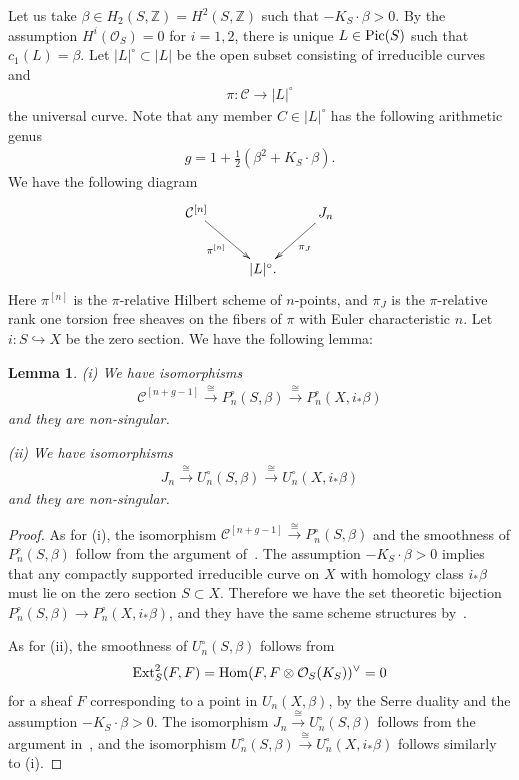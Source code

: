 \documentclass[11pt]{amsart}
\theoremstyle{plain}
\newtheorem{lem}[thm]{Lemma}
\newcommand{\cC}{\mathcal{C}}
\newcommand{\oO}{\mathcal{O}}
\newcommand{\Hom}{\mathop{\rm Hom}\nolimits}
\newcommand{\Pic}{\mathop{\rm Pic}\nolimits}
\newcommand{\Ext}{\mathop{\rm Ext}\nolimits}
\begin{document}
Let us take $\beta \in H_2(S, \mathbb{Z})=H^2(S, \mathbb{Z})$
such that $-K_S \cdot \beta>0$. 
By the assumption $H^i(\oO_S)=0$ for $i=1, 2$, there is unique 
$L \in \Pic(S)$ such that 
$c_1(L)=\beta$. 
Let
$\lvert L \rvert^{\circ} \subset \lvert L \rvert$
be the open subset consisting of 
irreducible curves and 
\begin{align*}
\pi \colon \cC \to \lvert L \rvert^{\circ}
\end{align*}
the universal curve. 
Note that any member $C \in \lvert L \vert^{\circ}$ has 
the following arithmetic genus
\begin{align*}
g=1+\frac{1}{2}(\beta^2+K_S \cdot \beta).
\end{align*}
We have the following diagram
\begin{align*}
\xymatrix{
\cC^{[n]} \ar[rd]_-{\pi^{[n]}} & & J_n \ar[ld]^-{\pi_J} \\
& \lvert L \rvert^{\circ}. 
}
\end{align*}
Here $\pi^{[n]}$ is the $\pi$-relative Hilbert scheme of $n$-points, 
and $\pi_J$ is the $\pi$-relative rank one torsion free sheaves
on the fibers of $\pi$ with Euler characteristic $n$. 
Let $i \colon S \hookrightarrow X$ be the zero section.
We have the following lemma: 
\begin{lem}\label{lem:locsurface}
(i) We have isomorphisms
\begin{align*}
\cC^{[n+g-1]} \stackrel{\cong}{\to} P_n^{\circ}(S, \beta) \stackrel{\cong}{\to} P_n^{\circ}(X, i_{\ast}\beta)
\end{align*}
and they are non-singular. 

(ii) We have isomorphisms
\begin{align*}
J_n \stackrel{\cong}{\to} U_n^{\circ}(S, \beta) \stackrel{\cong}{\to}
U_n^{\circ}(X, i_{\ast}\beta)
\end{align*}
and they are non-singular. 
\end{lem}
\begin{proof}
As for (i), the isomorphism 
$\cC^{[n+g-1]} \stackrel{\cong}{\to} 
P_n^{\circ}(S, \beta)$
and the smoothness of 
$P_n^{\circ}(S, \beta)$ follow from the argument 
of~\cite[Proposition~B.8, Proposition~C.2]{PT3}.
The assumption $-K_S \cdot \beta>0$ implies that 
any compactly supported irreducible curve on $X$ with 
homology class $i_{\ast}\beta$ must lie on 
the zero section $S \subset X$. 
Therefore we have 
the set theoretic bijection
$P_n^{\circ}(S, \beta) \to
P_n^{\circ}(X, i_{\ast}\beta)$, and they 
have the same scheme structures 
by~\cite[Proposition~3.4]{MR3238154}. 

As for (ii), the smoothness 
of $U_n^{\circ}(S, \beta)$ follows from 
\begin{align*}
\Ext_S^2(F, F)=\Hom(F, F \otimes \oO_S(K_S))^{\vee}=0
\end{align*}
for a sheaf $F$ corresponding to a point in $U_n(X, \beta)$,
by the Serre duality and the assumption 
$-K_S \cdot \beta>0$. 
The isomorphism 
$J_n \stackrel{\cong}{\to} U_n^{\circ}(S, \beta)$
follows 
from the argument in~\cite[Subsection~5.3]{MT}, and the 
isomorphism 
$U_n^{\circ}(S, \beta) \stackrel{\cong}{\to}
U_n^{\circ}(X, i_{\ast}\beta)$
follows similarly to (i). 
\end{proof}
\end{document}
